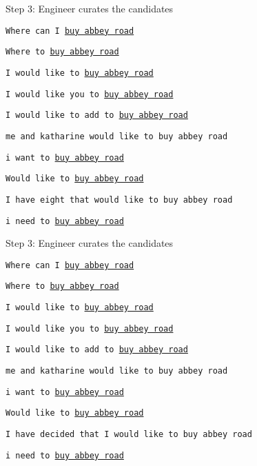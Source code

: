 \documentclass[12pt]{beamer}
\begin{document}
\begin{frame}{Step 3: Engineer curates the candidates}

  \texttt{Where can I \underline{buy abbey road}}

  \texttt{Where to \underline{buy abbey road}}

  \texttt{I would like to \underline{buy abbey road}}

  \bigskip 

  \texttt{I would like you to \underline{buy abbey road}}

  \texttt{I would like to add to \underline{buy abbey road}}

  \texttt{me and katharine would like to buy abbey road}

  \texttt{i want to \underline{buy abbey road}}

  \texttt{Would like to \underline{buy abbey road}}

  {\color{red}\texttt{I have eight that would like to buy abbey road}}

    \texttt{i need to \underline{buy abbey road}}

  \end{frame}

  \begin{frame}{Step 3: Engineer curates the candidates}

    \texttt{Where can I \underline{buy abbey road}}

    \texttt{Where to \underline{buy abbey road}}

    \texttt{I would like to \underline{buy abbey road}}

    \bigskip 

    \texttt{I would like you to \underline{buy abbey road}}

    \texttt{I would like to add to \underline{buy abbey road}}

    \texttt{me and katharine would like to buy abbey road}

    \texttt{i want to \underline{buy abbey road}}

    \texttt{Would like to \underline{buy abbey road}}

    {\small \texttt{I have decided that I would like to buy abbey road}}

    \texttt{i need to \underline{buy abbey road}}

  \end{frame}
\end{document}
